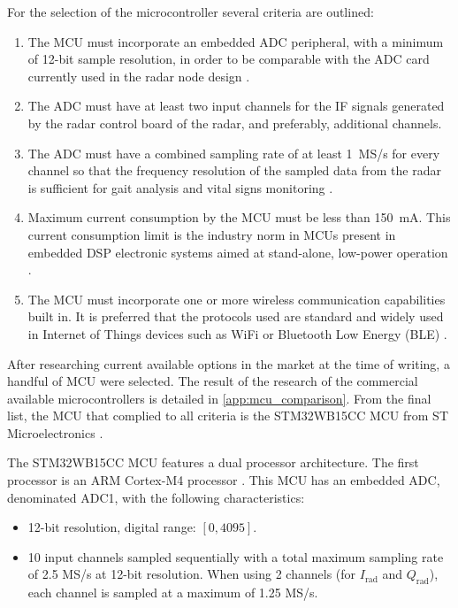 For the selection of the microcontroller several criteria are outlined:
\begin{enumerate}
	\item The MCU must incorporate an embedded ADC peripheral, with a minimum of 12-bit sample resolution, in order to be comparable with the ADC card currently used in the radar node design \cite{Sardinero2022, ADLINKTechnologies2010}.
	\item The ADC must have at least two input channels for the IF signals generated by the radar control board of the radar, and preferably, additional channels.
	\item The ADC must have a combined sampling rate of at least \SI{1}{MS/s} for every channel so that the frequency resolution of the sampled data from the radar is sufficient for gait analysis and vital signs monitoring \cite{Antolinos2020, Sardinero2022}.
	\item Maximum current consumption by the MCU must be less than \SI{150}{\milli\ampere}. This current consumption limit is the industry norm in MCUs present in embedded DSP electronic systems aimed at stand-alone, low-power operation \cite{Benini2001}.
	\item The MCU must incorporate one or more wireless communication capabilities built in. It is preferred that the protocols used are standard and widely used in Internet of Things devices such as WiFi or Bluetooth Low Energy (BLE) \cite{AlSarawi2017}.
\end{enumerate}

After researching current available options in the market at the time of writing, a handful of MCU were selected. The result of the research of the commercial available microcontrollers is detailed in \cref{app:mcu_comparison}.
From the final list, the MCU that complied to all criteria is the STM32WB15CC MCU from ST Microelectronics \cite{STMicroelectronics2022}.

The STM32WB15CC MCU features a dual processor architecture. The first processor is an ARM Cortex-M4 processor \cite{STMicroelectronics2022}. This MCU has an embedded ADC, denominated ADC1, with the following characteristics:
\begin{itemize}
	\item 12-bit resolution, digital range: $[0, 4095]$.
	\item 10 input channels sampled sequentially with a total maximum sampling rate of 2.5 MS/s at 12-bit resolution. When using 2 channels (for $I_\mathrm{rad}$ and $Q_\mathrm{rad}$), each channel is sampled at a maximum of 1.25 MS/s.
\end{itemize}

